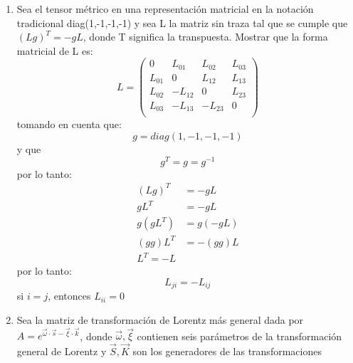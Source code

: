 \documentclass[12pt,letterpaper]{report}
\begin{document}
\begin{enumerate}
\begin{align*}
\begin{matrix}
        \end{matrix}\right)
    \end{align*}
    por lo tanto:
    \begin{align*}
        A_0 &= A^0 \\
        A_1 &= -A^1 \\
        A_2 &= -A^2 \\
        A_3 &= -A^3 \\
    \end{align*}
    \item Sea el tensor métrico en una representación matricial en la notación tradicional diag(1,-1,-1,-1) y sea L la matriz
    sin traza tal que se cumple que $(Lg)^T=-gL$, donde T significa la transpuesta. Mostrar que la forma matricial de L es:
    \begin{equation*}
        L=\left(\begin{matrix}
            0 & L_{01} & L_{02} & L_{03} \\
            L_{01} & 0 & L_{12} & L_{13} \\
            L_{02} & -L_{12} & 0 & L_{23} \\
            L_{03} & -L_{13} & -L_{23} & 0 \\
        \end{matrix}\right)
    \end{equation*}
    tomando en cuenta que:
    \begin{equation*}
        g=diag(1,-1,-1,-1)
    \end{equation*}
    y que
    \begin{equation*}
        g^T=g=g^{-1}
    \end{equation*}
    por lo tanto:
    \begin{align*}
        (Lg)^T&=-gL\\
        gL^T&=-gL\\
        g(gL^T)&=g(-gL)\\
        (gg)L^T&=-(gg)L\\
        L^T=-L
    \end{align*}
    por lo tanto:
    \begin{equation*}
        L_{ji}=-L_{ij}
    \end{equation*}
    si $i=j$, entonces $L_{ii}=0$
\item Sea la matriz de transformación de Lorentz más general dada por $A=e^{\vec{\omega}\cdot\vec{s}-\vec{\xi}\cdot  \vec{k}}$, donde 
$\vec{\omega},\vec{\xi}$ contienen seis parámetros de la transformación general de Lorentz y $\vec{S},\vec{K}$ son los generadores de las transformaciones

\end{enumerate}
\end{document}
